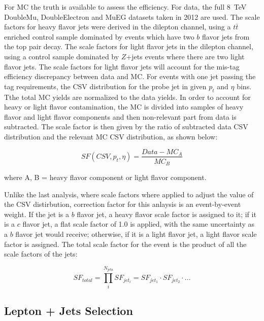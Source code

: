 \par For MC the truth is available to assess the efficiency.  For
data, the full 8~TeV DoubleMu, DoubleElectron and MuEG datasets taken
in 2012 are used. The scale factors for heavy flavor jets were derived in the
dilepton channel, using a $t\bar{t}$ enriched control sample dominated
by events which have two $b$ flavor jets from the top pair decay.  The
scale factors for light flavor jets in the dilepton channel, using a
control sample dominated by $Z$+jets events where there are two light
flavor jets. The scale factors for light flavor jets will account for
the mis-tag efficiency discrepancy between data and MC. For events
with one jet passing the tag requirements, the CSV
distribution for the probe jet in given $p_{t}$ and $\eta$ 
bins. Tthe total MC yields are normalized to the data yields. In order to
account for heavy or light flavor contamination, the MC is divided into
samples of heavy flavor and light flavor components and then
non-relevant part from data is subtracted. The scale factor is then
given by the ratio of subtracted data CSV distribution and the relevant MC
CSV distribution, as shown below:

\begin{equation}
SF(CSV, p_{t}, \eta) = \frac{Data - MC_{A}}{MC_{B}} 
\end{equation}

\noindent where A, B = heavy flavor component or light flavor component.

\par Unlike the last analysis, where scale factors where applied to
adjust the value of the CSV distirbution, correction factor for this
anlaysis is an event-by-event weight.  If the jet is a $b$ flavor jet,
a heavy flavor scale factor is assigned to it; if it is a $c$ flavor
jet, a flat scale factor of 1.0 is applied, with the same uncertainty
as a $b$ flavor jet would receive; otherwise, if it is a
light flavor jet, a light flavor scale factor is assigned.  The total
scale factor for the event is the product of all the scale factors of
the jets: 

\begin{equation}
SF_{total} = \prod_{i}^{N_{\mathrm{jets}}} SF_{jet_{i}} = SF_{jet_{1}} \cdot SF_{jet_{2}} \cdot ...
\end{equation}


\subsection{Lepton + Jets Selection}
\label{LJ_selection_II_overview}

